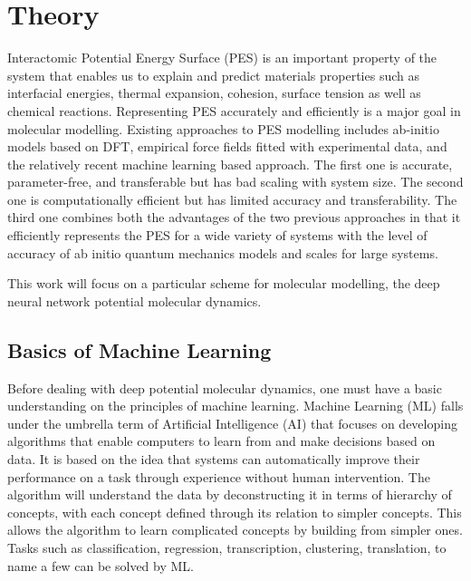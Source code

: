 \chapter{Theory}

Interactomic Potential Energy Surface (PES) is an important property of the
system
that enables us to explain and predict materials properties such as interfacial
energies, thermal expansion, cohesion, surface tension as well as chemical
reactions.
Representing PES accurately and efficiently is a major goal in molecular
modelling.
Existing approaches to PES modelling includes ab-initio models based on DFT,
empirical force fields fitted with experimental data, and the
relatively recent
machine learning based approach. The first one is accurate, parameter-free, and
transferable but has bad scaling with system size. The second one is
computationally efficient but has limited accuracy and transferability.
The third one combines both the advantages of the two previous approaches in
that it efficiently represents the PES for a
wide variety of systems with the level of accuracy of ab initio quantum
mechanics
models and scales for large systems.

This work will focus on a particular scheme for molecular modelling, the deep
neural network
potential molecular dynamics.

\section{Basics of Machine Learning}
Before dealing with deep potential molecular dynamics, one must have a basic
understanding on the principles of machine learning. Machine Learning (ML)
falls
under
the umbrella
term of Artificial Intelligence
(AI)
that focuses on developing algorithms that enable computers to learn from and
make decisions based on data. It is based on the idea that systems can
automatically improve their performance on a task through experience without
human intervention. The algorithm will understand the data by deconstructing it
in terms of hierarchy of concepts, with each concept defined through its
relation to simpler concepts. This allows the algorithm to learn complicated
concepts by building from simpler ones. Tasks such as classification,
regression, transcription, clustering, translation, to name a few can be solved
by ML.


